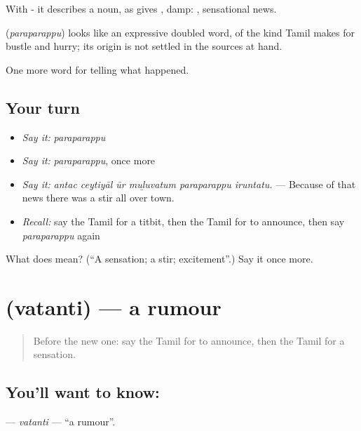 With - it describes a noun, as  gives , damp:  , sensational news.

\begin{cousinweb}
\textbf{} (\emph{paraparappu}) looks like an expressive doubled word, of the kind Tamil makes for bustle and hurry; its origin is not settled in the sources at hand.
\end{cousinweb}

\begin{grammarlens}[title={What you've built}]
One more word for telling what happened.
\end{grammarlens}

\subsection*{Your turn}
\begin{itemize}
\raggedright
  \item \emph{Say it:} \emph{paraparappu}
  \item \emph{Say it:} \emph{paraparappu}, once more
  \item \emph{Say it:} \emph{antac ceytiyāl ūr muḻuvatum paraparappu iruntatu.} — Because of that news there was a stir all over town.
  \item \emph{Recall:} say the Tamil for a titbit, then the Tamil for to announce, then say \emph{paraparappu} again
\end{itemize}

\begin{tcolorbox}[breakable,colback=teal!4,colframe=teal!35!black,title={Before you move on}]
What does  mean? (\textquotedblleft{}A sensation; a stir; excitement\textquotedblright{}.) Say it once more.
\end{tcolorbox}
\section[\texorpdfstring{\ta{வதந்தி} (vatanti)}{வதந்தி (vatanti)}]{ (vatanti) — a rumour}

\label{lesson:TA-C308-vatanti}



\begin{quote}
Before the new one: say the Tamil for to announce, then the Tamil for a sensation.
\end{quote}

\subsection*{You'll want to know: }
\textbf{} — \emph{vatanti} — \textquotedblleft{}a rumour\textquotedblright{}.

